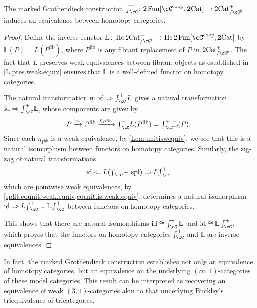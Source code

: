 \documentclass[11pt, dvipsnames]{amsart}
\begin{document}
    \begin{thm}\label{mainthm}
         The marked Grothendieck construction 
   ${\textstyle \int}_{\cC}^+ \colon 2\Fun[\cC^{\coop},\ttwocat] \to \mslicetwocat$
   induces an equivalence between homotopy categories.
    \end{thm}
    \begin{proof}
  Define the inverse functor $\mathbb{L}\colon \Ho\mslicetwocat\to \Ho 2\Fun[\cC^{\coop},\ttwocat]$ by $\mathbb{L}(P)=L(P^\mathrm{fib})$, where $P^\mathrm{fib}$ is any fibrant replacement of $P$ in $\mslicetwocat$. The fact that $L$ preserves weak equivalences between fibrant objects as established in \cref{L.pres.weak.equiv} ensures that $\mathbb{L}$ is a well-defined functor on homotopy categories.

  The natural transformation $\eta\colon \id\Rightarrow \int_\cC^+ L$ gives a natural transformation $\id\Rightarrow{\textstyle \int}_\cC^+\mathbb{L}$, whose components are given by \[P\xrightarrow{\sim} P^\mathrm{fib}\xrightarrow{\eta_{P^\mathrm{fib}}} {\textstyle \int}_\cC^+ L(P^\mathrm{fib})={\textstyle \int}_\cC^+\mathbb{L}(P).\] Since each $\eta_{P^\mathrm{fib}}$ is a weak equivalence, by \cref{Lem:unitiswequiv}, we see that this is a natural isomorphism between functors on homotopy categories. Similarly, the zig-zag of natural transformations \[\id \Leftarrow L({\textstyle \int}_\cC^+ -,\mathrm{spl})\Rightarrow L{\textstyle \int}_\cC^+\] which are pointwise weak equivalences, by \cref{split.counit.weak.equiv,counit.is.weak.equiv}, determines a natural isomorphism $\id\Rightarrow L{\textstyle \int}_\cC^+=\mathbb{L}{\textstyle \int}_\cC^+$ between functors on homotopy categories. 

  This shows that there are natural isomorphisms $\id\cong\int_\cC^+\mathbb{L}$ and $\id\cong \mathbb{L}\int_\cC^+$, which proves that the functors on homotopy categories $\int_\cC^+$ and $\mathbb{L}$ are inverse equivalences.
    \end{proof}

In fact, the marked Grothendieck construction establishes not only an equivalence of homotopy categories, but an equivalence on the underlying $(\infty, 1)$-categories of these model categories.
This result can be interpreted as recovering an equivalence of weak $(3, 1)$-categories akin to that underlying Buckley's triequivalence of tricategories.
\end{document}
